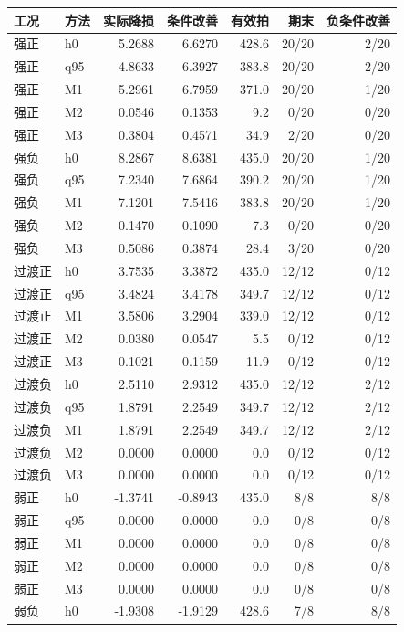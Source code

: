 \begin{tabular}{llrrrrr}
\toprule
工况 & 方法 & 实际降损 & 条件改善 & 有效拍 & 期末 & 负条件改善 \\
\midrule
强正 & h0 & 5.2688 & 6.6270 & 428.6 & 20/20 & 2/20 \\
强正 & q95 & 4.8633 & 6.3927 & 383.8 & 20/20 & 2/20 \\
强正 & M1 & 5.2961 & 6.7959 & 371.0 & 20/20 & 1/20 \\
强正 & M2 & 0.0546 & 0.1353 & 9.2 & 0/20 & 0/20 \\
强正 & M3 & 0.3804 & 0.4571 & 34.9 & 2/20 & 0/20 \\
强负 & h0 & 8.2867 & 8.6381 & 435.0 & 20/20 & 1/20 \\
强负 & q95 & 7.2340 & 7.6864 & 390.2 & 20/20 & 1/20 \\
强负 & M1 & 7.1201 & 7.5416 & 383.8 & 20/20 & 1/20 \\
强负 & M2 & 0.1470 & 0.1090 & 7.3 & 0/20 & 0/20 \\
强负 & M3 & 0.5086 & 0.3874 & 28.4 & 3/20 & 0/20 \\
过渡正 & h0 & 3.7535 & 3.3872 & 435.0 & 12/12 & 0/12 \\
过渡正 & q95 & 3.4824 & 3.4178 & 349.7 & 12/12 & 0/12 \\
过渡正 & M1 & 3.5806 & 3.2904 & 339.0 & 12/12 & 0/12 \\
过渡正 & M2 & 0.0380 & 0.0547 & 5.5 & 0/12 & 0/12 \\
过渡正 & M3 & 0.1021 & 0.1159 & 11.9 & 0/12 & 0/12 \\
过渡负 & h0 & 2.5110 & 2.9312 & 435.0 & 12/12 & 2/12 \\
过渡负 & q95 & 1.8791 & 2.2549 & 349.7 & 12/12 & 2/12 \\
过渡负 & M1 & 1.8791 & 2.2549 & 349.7 & 12/12 & 2/12 \\
过渡负 & M2 & 0.0000 & 0.0000 & 0.0 & 0/12 & 0/12 \\
过渡负 & M3 & 0.0000 & 0.0000 & 0.0 & 0/12 & 0/12 \\
弱正 & h0 & -1.3741 & -0.8943 & 435.0 & 8/8 & 8/8 \\
弱正 & q95 & 0.0000 & 0.0000 & 0.0 & 0/8 & 0/8 \\
弱正 & M1 & 0.0000 & 0.0000 & 0.0 & 0/8 & 0/8 \\
弱正 & M2 & 0.0000 & 0.0000 & 0.0 & 0/8 & 0/8 \\
弱正 & M3 & 0.0000 & 0.0000 & 0.0 & 0/8 & 0/8 \\
弱负 & h0 & -1.9308 & -1.9129 & 428.6 & 7/8 & 8/8 \\

\end{tabular}
